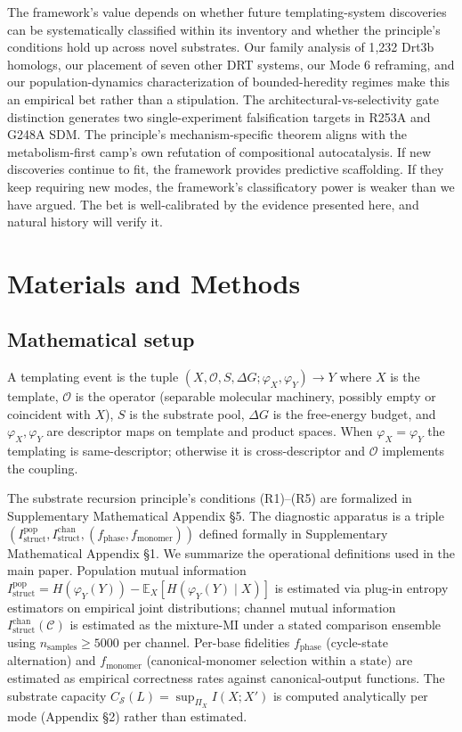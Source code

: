 \documentclass[aps,prx,reprint,amsmath,amssymb,floatfix,superscriptaddress,nofootinbib]{revtex4-2}
\theoremstyle{plain-thm}
\theoremstyle{definition-thm}
\newcommand{\Istructpop}{I_{\mathrm{struct}}^{\mathrm{pop}}}
\newcommand{\Istructchan}{I_{\mathrm{struct}}^{\mathrm{chan}}}
\newcommand{\fphase}{f_{\mathrm{phase}}}
\newcommand{\fmonomer}{f_{\mathrm{monomer}}}
\newcommand{\Csub}{C_{\mathcal{S}}}
\newcommand{\descX}{\varphi_X}
\newcommand{\descY}{\varphi_Y}
\newcommand{\Op}{\mathcal{O}}
\begin{document}
The framework's value depends on whether future templating-system discoveries can be systematically classified within its inventory and whether the principle's conditions hold up across novel substrates. Our family analysis of 1{,}232 Drt3b homologs, our placement of seven other DRT systems, our Mode 6 reframing, and our population-dynamics characterization of bounded-heredity regimes make this an empirical bet rather than a stipulation. The architectural-vs-selectivity gate distinction generates two single-experiment falsification targets in R253A and G248A SDM. The principle's mechanism-specific theorem aligns with the metabolism-first camp's own refutation of compositional autocatalysis. If new discoveries continue to fit, the framework provides predictive scaffolding. If they keep requiring new modes, the framework's classificatory power is weaker than we have argued. The bet is well-calibrated by the evidence presented here, and natural history will verify it.


\section{Materials and Methods}

\subsection{Mathematical setup}

A templating event is the tuple $(X, \Op, S, \Delta G; \descX, \descY) \to Y$ where $X$ is the template, $\Op$ is the operator (separable molecular machinery, possibly empty or coincident with $X$), $S$ is the substrate pool, $\Delta G$ is the free-energy budget, and $\descX, \descY$ are descriptor maps on template and product spaces. When $\descX = \descY$ the templating is same-descriptor; otherwise it is cross-descriptor and $\Op$ implements the coupling.

The substrate recursion principle's conditions (R1)--(R5) are formalized in Supplementary Mathematical Appendix \S5. The diagnostic apparatus is a triple $(\Istructpop, \Istructchan, (\fphase, \fmonomer))$ defined formally in Supplementary Mathematical Appendix \S1. We summarize the operational definitions used in the main paper. Population mutual information $\Istructpop = H(\descY(Y)) - \mathbb{E}_X[H(\descY(Y) \mid X)]$ is estimated via plug-in entropy estimators on empirical joint distributions; channel mutual information $\Istructchan(\mathcal{C})$ is estimated as the mixture-MI under a stated comparison ensemble using $n_{\mathrm{samples}} \ge 5000$ per channel. Per-base fidelities $\fphase$ (cycle-state alternation) and $\fmonomer$ (canonical-monomer selection within a state) are estimated as empirical correctness rates against canonical-output functions. The substrate capacity $\Csub(L) = \sup_{\Pi_X} I(X; X')$ is computed analytically per mode (Appendix \S2) rather than estimated.
\end{document}
